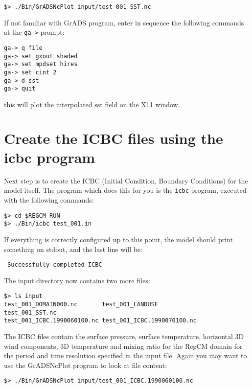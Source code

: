 \begin{Verbatim}
$> ./Bin/GrADSNcPlot input/test_001_SST.nc
\end{Verbatim}

If not familiar with GrADS program, enter in sequence the following commands at
the \verb=ga->= prompt:

\begin{Verbatim}
ga-> q file
ga-> set gxout shaded
ga-> set mpdset hires
ga-> set cint 2
ga-> d sst
ga-> quit
\end{Verbatim}

this will plot the interpolated sst field on the X11 window.

\section{Create the ICBC files using the icbc program}

Next step is to create the ICBC (Initial Condition, Boundary Conditions) for
the model itself. The program which does this for you is the \verb=icbc=
program, executed with the following commands:

\begin{Verbatim}
$> cd $REGCM_RUN
$> ./Bin/icbc test_001.in
\end{Verbatim}

If everything is correctly configured up to this point, the model should print
something on stdout, and the last line will be:

\begin{Verbatim}
 Successfully completed ICBC
\end{Verbatim}

The input directory now contains two more files:

\begin{Verbatim}
$> ls input
test_001_DOMAIN000.nc       test_001_LANDUSE            test_001_SST.nc
test_001_ICBC.1990060100.nc test_001_ICBC.1990070100.nc
\end{Verbatim}

The ICBC files contain the surface pressure, surface temperature, horizontal
3D wind components, 3D temperature and mixing ratio for the RegCM domain for the
period and time resolution specified in the input file.
Again you may want to use the GrADSNcPlot program to look at file content:

\begin{Verbatim}
$> ./Bin/GrADSNcPlot input/test_001_ICBC.1990060100.nc
\end{Verbatim}

